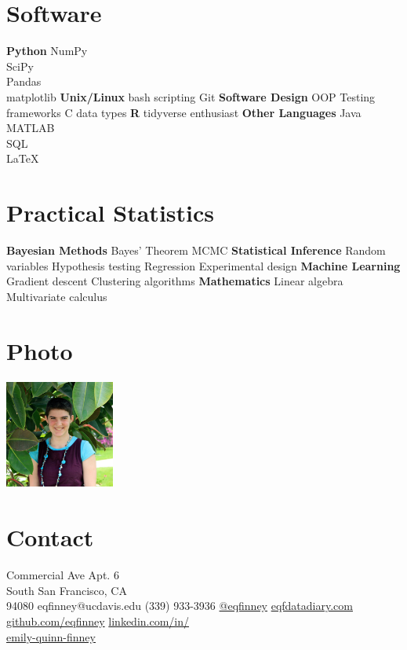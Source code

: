 \documentclass[]{cv-style}          %
\begin{document}
\begin{aside}
%
\section{Software}
\textbf{Python}
NumPy\\ SciPy\\ Pandas\\ matplotlib
\textbf{Unix/Linux}
bash scripting
Git
\textbf{Software Design}
OOP
Testing frameworks
C data types
\textbf{R}
tidyverse enthusiast
\textbf{Other Languages}
Java\\ MATLAB\\ SQL\\ \LaTeX
%
\section{Practical Statistics}
\textbf{Bayesian Methods}
Bayes' Theorem
MCMC
\textbf{Statistical Inference}
Random variables
Hypothesis testing
Regression
Experimental design
\textbf{Machine Learning}
Gradient descent
Clustering algorithms
\textbf{Mathematics}
Linear algebra
Multivariate calculus
%
\section{Photo}
\includegraphics[width=3.6cm,height=3.6cm]{headshot.jpg}
%
\section{Contact}
\fontsize{8}{10} Commercial Ave Apt. 6\\ South San Francisco, CA \\\hspace{0.5cm}94080
%
eqfinney@ucdavis.edu
%
(339) 933-3936
%
\href{https://twitter.com/eqfinney}{@eqfinney}
%
\href{https://eqfdatadiary.com/}{eqfdatadiary.com}
%
\href{https://github.com/eqfinney}{github.com/eqfinney}
%
\href{linkedin.com/in/emily-quinn-finney}{linkedin.com/in/\\\hspace{0.5cm}emily-quinn-finney}
\end{aside}
\end{document}
